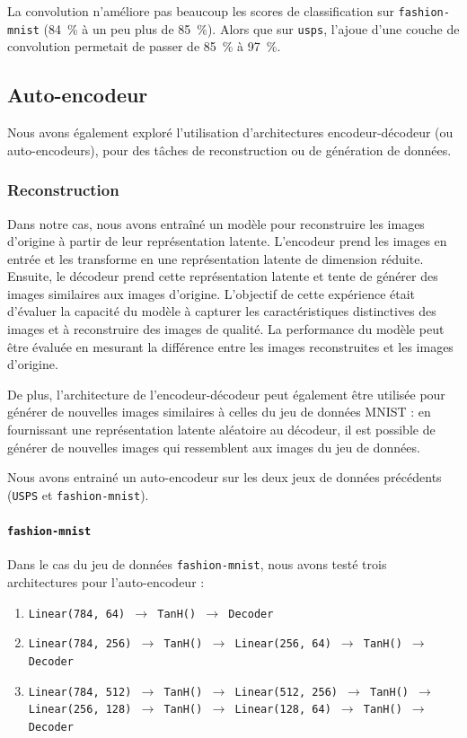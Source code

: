 \documentclass{article}
\begin{document}
La convolution n'améliore pas beaucoup les scores de classification sur \texttt{fashion-mnist} (84~\% à un peu plus de 85~\%). Alors que sur \texttt{usps}, l'ajoue d'une couche de convolution permetait de passer de 85~\% à 97~\%.

\subsection{Auto-encodeur}

Nous avons également exploré l'utilisation d'architectures encodeur-décodeur (ou auto-encodeurs), pour des tâches de reconstruction ou de génération de données.

\subsubsection{Reconstruction}

Dans notre cas, nous avons entraîné un modèle pour reconstruire les images d'origine à partir de leur représentation latente. L'encodeur prend les images en entrée et les transforme en une représentation latente de dimension réduite. Ensuite, le décodeur prend cette représentation latente et tente de générer des images similaires aux images d'origine. L'objectif de cette expérience était d'évaluer la capacité du modèle à capturer les caractéristiques distinctives des images et à reconstruire des images de qualité. La performance du modèle peut être évaluée en mesurant la différence entre les images reconstruites et les images d'origine.

De plus, l'architecture de l'encodeur-décodeur peut également être utilisée pour générer de nouvelles images similaires à celles du jeu de données MNIST : en fournissant une représentation latente aléatoire au décodeur, il est possible de générer de nouvelles images qui ressemblent aux images du jeu de données.

Nous avons entrainé un auto-encodeur sur les deux jeux de données précédents (\texttt{USPS} et \texttt{fashion-mnist}). 

\paragraph*{\texttt{fashion-mnist}}

Dans le cas du jeu de données \texttt{fashion-mnist}, nous avons testé trois architectures pour l'auto-encodeur :

\begin{enumerate}
    \item \label{reseau1} \texttt{Linear(784, 64) $\rightarrow$ TanH() $\rightarrow$ Decoder} 
    \item \texttt{Linear(784, 256) $\rightarrow$ TanH() $\rightarrow$ Linear(256, 64) $\rightarrow$ TanH() $\rightarrow$ Decoder}
    \item \texttt{Linear(784, 512) $\rightarrow$ TanH() $\rightarrow$ Linear(512, 256) $\rightarrow$ TanH() $\rightarrow$ Linear(256, 128) $\rightarrow$ TanH() $\rightarrow$ Linear(128, 64) $\rightarrow$ TanH() $\rightarrow$ Decoder}
\end{enumerate}
\end{document}
